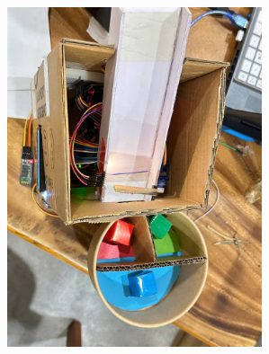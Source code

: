\documentclass[conference, onecolumn]{IEEEtran}
\begin{document}
\begin{center}
    \includegraphics[height=10cm, width=0.7\linewidth\textwidth]{z6445360191681_396b06afdb3631ef00f2b56fdf70380e.jpg}
    \label{fig1}
    \end{center}
      \vspace{3em}
\noindent
\end{document}
